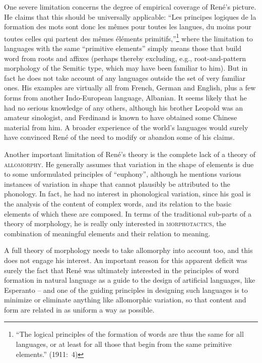 \documentclass[output=paper]{langsci/langscibook}
\begin{document}
One severe limitation concerns the degree of empirical coverage of
René's picture. He claims that this should be universally applicable:
``Les principes logiques de la formation des mots sont donc les mêmes
pour toutes les langues, du moins pour toutes celles qui partent des
mêmes éléments primitifs,''\footnote{``The logical principles of the
  formation of words are thus the same for all languages, or at least
  for all those that begin from the same primitive elements.''
  (1911:~4)} where the limitation to languages with the same
``primitive elements'' simply means those that build word from roots
and affixes (perhaps thereby excluding, e.g., root-and-pattern
morphology of the Semitic type, which may have been familiar to him).
But in fact he does not take account of any languages outside the set
of very familiar ones.  His examples are virtually all from French,
German and English, plus a few forms from another Indo-European
language, Albanian. It seems likely that he had no serious knowledge
of any others, although his brother Leopold was an amateur sinologist,
and Ferdinand is known to have obtained some Chinese material from
him.  A broader experience of the world's languages would surely have
convinced René of the need to modify or abandon some of his claims.

Another important limitation of René's theory is the complete lack of
a theory of \textsc{allomorphy}. He generally assumes that variation in the
shape of elements is due to some unformulated principles of ``euphony'',
although he mentions various instances of variation in shape that
cannot plausibly be attributed to the phonology.  In fact, he had no
interest in phonological variation, since his goal is the analysis of
the content of complex words, and its relation to the basic elements
of which these are composed. In terms of the traditional sub-parts of
a theory of morphology, he is really only interested in
\textsc{morphotactics}, the combination of meaningful elements and their
relation to meaning. 

A full theory of morphology needs to take allomorphy into
account too, and this does not engage his interest.  An important
reason for this apparent deficit was surely the fact that René was
ultimately interested in the principles of word formation in natural
language as a guide to the design of artificial languages, like
Esperanto -- and one of the guiding principles in designing such
languages is to minimize or eliminate anything like allomorphic
variation, so that content and form are related in as uniform a way as
possible.
\end{document}

